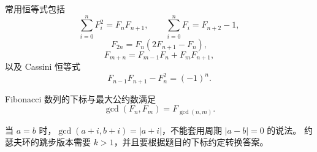 常用恒等式包括
\[
  \sum_{i=0}^{n}F_i^2=F_nF_{n+1},
  \qquad
  \sum_{i=0}^{n}F_i=F_{n+2}-1,
\]
\[
  F_{2n}=F_n(2F_{n+1}-F_n),
\]
\[
  F_{m+n}=F_{m-1}F_n+F_mF_{n+1},
\]
以及 Cassini 恒等式
\[
  F_{n-1}F_{n+1}-F_n^2=(-1)^n.
\]

Fibonacci 数列的下标与最大公约数满足
\[
  \gcd(F_n,F_m)=F_{\gcd(n,m)}.
\]

\begin{icpcwarning}[边界]
  当 $a=b$ 时，$\gcd(a+i,b+i)=|a+i|$，不能套用周期 $|a-b|=0$ 的说法。
  约瑟夫环的跳步版本需要 $k>1$，并且要根据题目的下标约定转换答案。
\end{icpcwarning}
